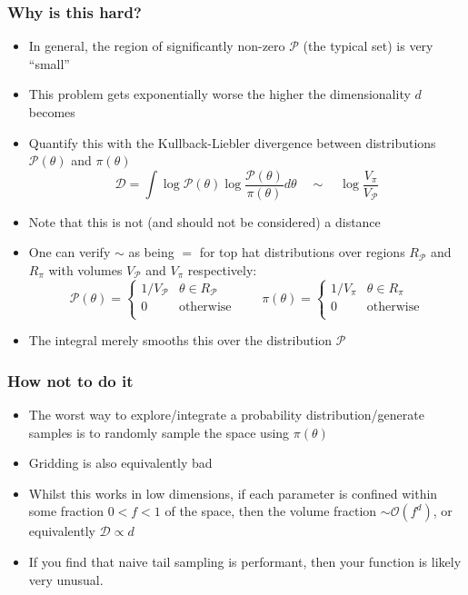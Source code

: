 \documentclass[aspectratio=169]{beamer}
\begin{document}
\begin{frame}
    \frametitle{Why is this hard?}
    \begin{itemize}
        \item In general, the region of significantly non-zero $\mathcal{P}$ (the typical set) is very ``small''
        \item This problem gets exponentially worse the higher the dimensionality $d$ becomes
        \item Quantify this with the Kullback-Liebler divergence between distributions $\mathcal{P}(\theta)$ and $\pi(\theta)$
            \[ \mathcal{D} = \int \log \mathcal{P}(\theta) \log\frac{\mathcal{P}(\theta)}{\pi(\theta)} d\theta \quad\sim\quad \log \frac{V_\pi}{V_\mathcal{P}} \]
        \item Note that this is \alert{not} (and should not be considered) a distance
        \item One can verify $\sim$ as being $=$ for top hat distributions over regions $R_\mathcal{P}$  and $R_\mathcal{\pi}$ with volumes $V_\mathcal{P}$ and $V_\mathcal{\pi}$ respectively:
            \[
                \mathcal{P}(\theta) = \left\{
                \begin{array}{cl}
                    1/V_\mathcal{P} & \theta \in R_\mathcal{P}\\
                    0 & \text{otherwise}\\
                \end{array}
            \right.
            \qquad
            \pi(\theta) = \left\{
                \begin{array}{cl}
                    1/V_\pi & \theta \in R_\pi\\
                    0 & \text{otherwise}\\
                \end{array}
            \right.
            \]
        \item The integral merely smooths this over the distribution $\mathcal{P}$
    \end{itemize}
\end{frame}

\begin{frame}
    \frametitle{How not to do it}
    \begin{itemize}
        \item The worst way to explore/integrate a probability distribution/generate samples is to randomly sample the space using $\pi(\theta)$~
        \item Gridding is also equivalently bad
        \item Whilst this works in low dimensions, if each parameter is confined within some fraction $0<f<1$ of the space, then the volume fraction $\sim\mathcal{O}(f^d)$, or equivalently $\mathcal{D}\propto d$ 
        \item If you find that naive tail sampling is performant, then your function is likely very unusual.
    \end{itemize}
\end{frame}
\end{document}
